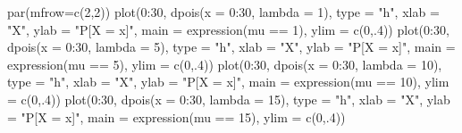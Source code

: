 \documentclass[
  10pt,
  a4paper]{book}
\newenvironment{Shaded}{\begin{snugshade}}{\end{snugshade}}
\newcommand{\AttributeTok}[1]{\textcolor[rgb]{0.77,0.63,0.00}{#1}}
\newcommand{\DecValTok}[1]{\textcolor[rgb]{0.00,0.00,0.81}{#1}}
\newcommand{\FunctionTok}[1]{\textcolor[rgb]{0.00,0.00,0.00}{#1}}
\newcommand{\NormalTok}[1]{#1}
\newcommand{\SpecialCharTok}[1]{\textcolor[rgb]{0.00,0.00,0.00}{#1}}
\newcommand{\StringTok}[1]{\textcolor[rgb]{0.31,0.60,0.02}{#1}}
\begin{document}
\begin{Shaded}
\begin{Highlighting}[]
\FunctionTok{par}\NormalTok{(}\AttributeTok{mfrow=}\FunctionTok{c}\NormalTok{(}\DecValTok{2}\NormalTok{,}\DecValTok{2}\NormalTok{))}
\FunctionTok{plot}\NormalTok{(}\DecValTok{0}\SpecialCharTok{:}\DecValTok{30}\NormalTok{, }\FunctionTok{dpois}\NormalTok{(}\AttributeTok{x =} \DecValTok{0}\SpecialCharTok{:}\DecValTok{30}\NormalTok{, }\AttributeTok{lambda =} \DecValTok{1}\NormalTok{), }\AttributeTok{type =} \StringTok{"h"}\NormalTok{,}
     \AttributeTok{xlab =} \StringTok{"X"}\NormalTok{, }\AttributeTok{ylab =} \StringTok{"P[X = x]"}\NormalTok{, }\AttributeTok{main =} \FunctionTok{expression}\NormalTok{(mu }\SpecialCharTok{==} \DecValTok{1}\NormalTok{),}
     \AttributeTok{ylim =} \FunctionTok{c}\NormalTok{(}\DecValTok{0}\NormalTok{,.}\DecValTok{4}\NormalTok{))}
\FunctionTok{plot}\NormalTok{(}\DecValTok{0}\SpecialCharTok{:}\DecValTok{30}\NormalTok{, }\FunctionTok{dpois}\NormalTok{(}\AttributeTok{x =} \DecValTok{0}\SpecialCharTok{:}\DecValTok{30}\NormalTok{, }\AttributeTok{lambda =} \DecValTok{5}\NormalTok{), }\AttributeTok{type =} \StringTok{"h"}\NormalTok{,}
     \AttributeTok{xlab =} \StringTok{"X"}\NormalTok{, }\AttributeTok{ylab =} \StringTok{"P[X = x]"}\NormalTok{, }\AttributeTok{main =} \FunctionTok{expression}\NormalTok{(mu }\SpecialCharTok{==} \DecValTok{5}\NormalTok{),}
     \AttributeTok{ylim =} \FunctionTok{c}\NormalTok{(}\DecValTok{0}\NormalTok{,.}\DecValTok{4}\NormalTok{))}
\FunctionTok{plot}\NormalTok{(}\DecValTok{0}\SpecialCharTok{:}\DecValTok{30}\NormalTok{, }\FunctionTok{dpois}\NormalTok{(}\AttributeTok{x =} \DecValTok{0}\SpecialCharTok{:}\DecValTok{30}\NormalTok{, }\AttributeTok{lambda =} \DecValTok{10}\NormalTok{), }\AttributeTok{type =} \StringTok{"h"}\NormalTok{,}
     \AttributeTok{xlab =} \StringTok{"X"}\NormalTok{, }\AttributeTok{ylab =} \StringTok{"P[X = x]"}\NormalTok{, }\AttributeTok{main =} \FunctionTok{expression}\NormalTok{(mu }\SpecialCharTok{==} \DecValTok{10}\NormalTok{),}
     \AttributeTok{ylim =} \FunctionTok{c}\NormalTok{(}\DecValTok{0}\NormalTok{,.}\DecValTok{4}\NormalTok{))}
\FunctionTok{plot}\NormalTok{(}\DecValTok{0}\SpecialCharTok{:}\DecValTok{30}\NormalTok{, }\FunctionTok{dpois}\NormalTok{(}\AttributeTok{x =} \DecValTok{0}\SpecialCharTok{:}\DecValTok{30}\NormalTok{, }\AttributeTok{lambda =} \DecValTok{15}\NormalTok{), }\AttributeTok{type =} \StringTok{"h"}\NormalTok{,}
     \AttributeTok{xlab =} \StringTok{"X"}\NormalTok{, }\AttributeTok{ylab =} \StringTok{"P[X = x]"}\NormalTok{, }\AttributeTok{main =} \FunctionTok{expression}\NormalTok{(mu }\SpecialCharTok{==} \DecValTok{15}\NormalTok{),}
     \AttributeTok{ylim =} \FunctionTok{c}\NormalTok{(}\DecValTok{0}\NormalTok{,.}\DecValTok{4}\NormalTok{))}
\end{Highlighting}
\end{Shaded}
\end{document}
